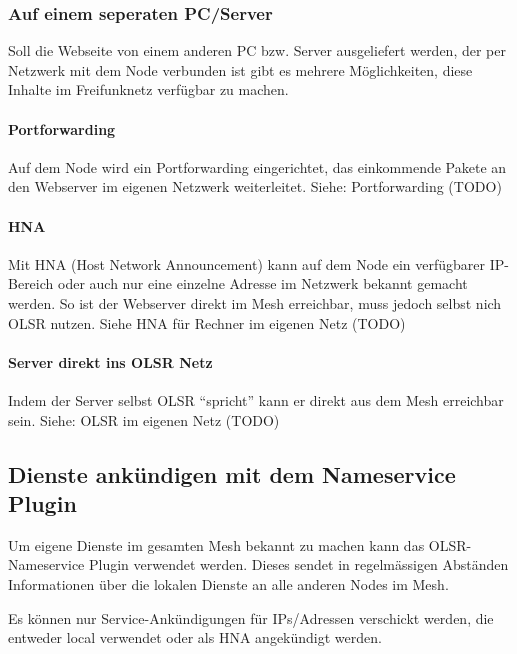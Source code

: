 \documentclass[a4paper,12pt,ngerman]{sphinxmanual}
\begin{document}
\subsubsection{Auf einem seperaten PC/Server}
\label{advanced/websites:auf-einem-seperaten-pc-server}
Soll die Webseite von einem anderen PC bzw. Server ausgeliefert werden,
der per Netzwerk mit dem Node verbunden ist gibt es mehrere Möglichkeiten,
diese Inhalte im Freifunknetz verfügbar zu machen.


\paragraph{Portforwarding}
\label{advanced/websites:portforwarding}
Auf dem Node wird ein Portforwarding eingerichtet, das einkommende Pakete
an den Webserver im eigenen Netzwerk weiterleitet. Siehe: Portforwarding (TODO)


\paragraph{HNA}
\label{advanced/websites:hna}
Mit HNA (Host Network Announcement) kann auf dem Node ein verfügbarer
IP-Bereich oder auch nur eine einzelne Adresse im Netzwerk bekannt gemacht
werden. So ist der Webserver direkt im Mesh erreichbar, muss jedoch selbst
nich OLSR nutzen. Siehe HNA für Rechner im eigenen Netz (TODO)


\paragraph{Server direkt ins OLSR Netz}
\label{advanced/websites:server-direkt-ins-olsr-netz}
Indem der Server selbst OLSR ``spricht'' kann er direkt aus dem Mesh erreichbar
sein. Siehe: OLSR im eigenen Netz (TODO)


\subsection{Dienste ankündigen mit dem Nameservice Plugin}
\label{advanced/nameservice::doc}\label{advanced/nameservice:dienste-ankundigen-mit-dem-nameservice-plugin}
Um eigene Dienste im gesamten Mesh bekannt zu machen kann das OLSR-Nameservice
Plugin verwendet werden. Dieses sendet in regelmässigen Abständen Informationen
über die lokalen Dienste an alle anderen Nodes im Mesh.

Es können nur Service-Ankündigungen für IPs/Adressen verschickt werden, die
entweder local verwendet oder als HNA angekündigt werden.
\end{document}
